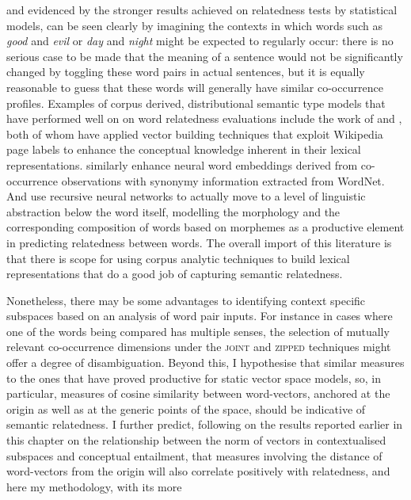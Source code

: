 and evidenced by the stronger results achieved on relatedness tests by statistical models, can be seen clearly by imagining the contexts in which words such as \emph{good} and \emph{evil} or \emph{day} and \emph{night} might be expected to regularly occur: there is no serious case to be made that the meaning of a sentence would not be significantly changed by toggling these word pairs in actual sentences, but it is equally reasonable to guess that these words will generally have similar co-occurrence profiles.  Examples of corpus derived, distributional semantic type models that have performed well on on word relatedness evaluations include the work of \cite{GarbilovichEA2007} and \cite{HassanEA2011}, both of whom have applied vector building techniques that exploit Wikipedia page labels to enhance the conceptual knowledge inherent in their lexical representations.  \cite{HalawiEA2012} similarly enhance neural word embeddings derived from co-occurrence observations with synonymy information extracted from WordNet.  And \cite{LuongEA2013} use recursive neural networks to actually move to a level of linguistic abstraction below the word itself, modelling the morphology and the corresponding composition of words based on morphemes as a productive element in predicting relatedness between words.  The overall import of this literature is that there is scope for using corpus analytic techniques to build lexical representations that do a good job of capturing semantic relatedness.

Nonetheless, there may be some advantages to identifying context specific subspaces based on an analysis of word pair inputs.  For instance in cases where one of the words being compared has multiple senses, the selection of mutually relevant co-occurrence dimensions under the \textsc{joint} and \textsc{zipped} techniques might offer a degree of disambiguation.  Beyond this, I hypothesise that similar measures to the ones that have proved productive for static vector space models, so, in particular, measures of cosine similarity between word-vectors, anchored at the origin as well as at the generic points of the space, should be indicative of semantic relatedness.  I further predict, following on the results reported earlier in this chapter on the relationship between the norm of vectors in contextualised subspaces and conceptual entailment, that measures involving the distance of word-vectors from the origin will also correlate positively with relatedness, and here my methodology, with its more 

